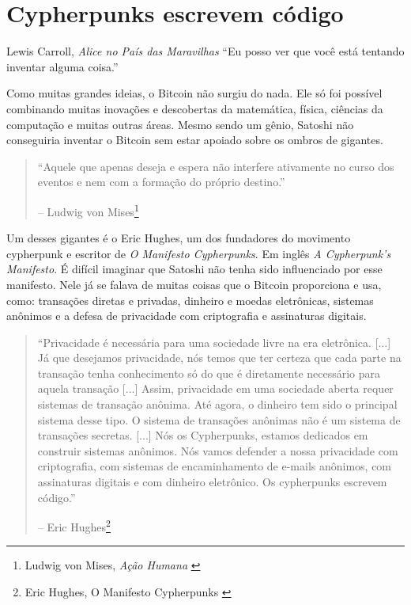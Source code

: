 \chapter{Cypherpunks escrevem código}
\label{les:20}

\begin{chapquote}{Lewis Carroll, \textit{Alice no País das Maravilhas}}
\enquote{Eu posso ver que você está tentando inventar alguma coisa.}
\end{chapquote}

Como muitas grandes ideias, o Bitcoin não surgiu do nada. Ele só foi possível combinando muitas inovações e descobertas da matemática, física, ciências da computação e muitas outras áreas. Mesmo sendo um gênio, Satoshi não conseguiria inventar o Bitcoin sem estar apoiado sobre os ombros de gigantes.

\begin{quotation}\begin{samepage}
\enquote{Aquele que apenas deseja e espera não interfere ativamente no curso dos eventos e nem com a formação do próprio destino.}
\begin{flushright} -- Ludwig von Mises\footnote{Ludwig von Mises, \textit{Ação Humana} \cite{human-action}}
\end{flushright}\end{samepage}\end{quotation}

Um desses gigantes é o Eric Hughes, um dos fundadores do movimento cypherpunk e escritor de \textit{O Manifesto Cypherpunks}. Em inglês \textit{A Cypherpunk's Manifesto}. É difícil imaginar que Satoshi não tenha sido influenciado por esse manifesto. Nele já se falava de muitas coisas que o Bitcoin proporciona e usa, como: transações diretas e privadas, dinheiro e moedas eletrônicas, sistemas anônimos e a defesa de privacidade com criptografia e assinaturas digitais.

\begin{quotation}\begin{samepage}
\enquote{Privacidade é necessária para uma sociedade livre na era eletrônica.
[...] Já que desejamos privacidade, nós temos que ter certeza que cada parte na transação tenha conhecimento só do que é diretamente necessário para aquela transação [...]
Assim, privacidade em uma sociedade aberta requer sistemas de transação anônima. Até agora, o dinheiro tem sido o principal sistema desse tipo. O sistema de transações anônimas não é um sistema de transações secretas. [...]
Nós os Cypherpunks, estamos dedicados em construir sistemas anônimos. Nós vamos defender a nossa privacidade com criptografia, com sistemas de encaminhamento de e-mails anônimos, com assinaturas digitais e com dinheiro eletrônico. Os cypherpunks escrevem código.}

\begin{flushright} -- Eric Hughes\footnote{Eric Hughes, O Manifesto Cypherpunks \cite{cypherpunk-manifesto}}
\end{flushright}\end{samepage}\end{quotation}

